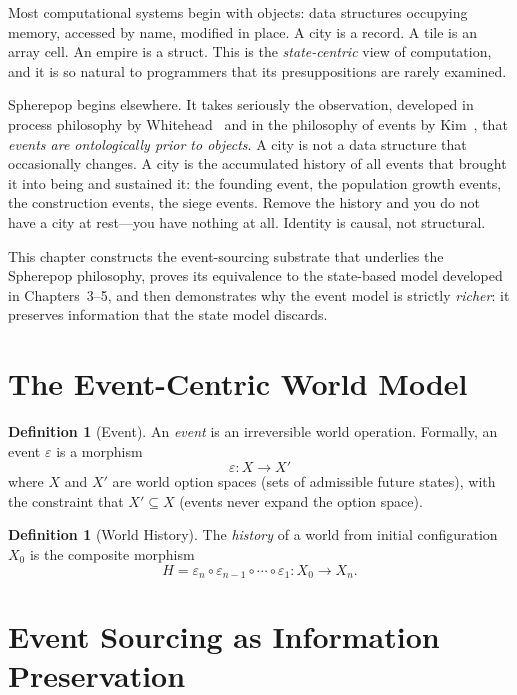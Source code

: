 \documentclass[11pt,a4paper,openany]{book}
\theoremstyle{plain}
\theoremstyle{definition}
\newtheorem{definition}[theorem]{Definition}
\theoremstyle{remark}
\newenvironment{background}{%
  \begin{mdframed}[
    linecolor=sphereblue!40, backgroundcolor=sphereblue!5,
    linewidth=1pt, innertopmargin=8pt, innerbottommargin=8pt,
    innerleftmargin=10pt, innerrightmargin=10pt,
    skipabove=10pt, skipbelow=6pt
  ]%
  \setlength{\parindent}{0pt}%
  \noindent{\textcolor{sphereblue}{\textbf{Background}}}\par\smallskip\ignorespaces
}{\end{mdframed}}
\begin{document}
\begin{background}
  Most computational systems begin with objects: data structures
  occupying memory, accessed by name, modified in place. A city is a
  record. A tile is an array cell. An empire is a struct. This is the
  \emph{state-centric} view of computation, and it is so natural to
  programmers that its presuppositions are rarely examined.

  Spherepop begins elsewhere. It takes seriously the observation,
  developed in process philosophy by Whitehead~\cite{Whitehead} and in
  the philosophy of events by Kim~\cite{Kim}, that \emph{events are
  ontologically prior to objects}. A city is not a data structure that
  occasionally changes. A city is the accumulated history of all events
  that brought it into being and sustained it: the founding event, the
  population growth events, the construction events, the siege events.
  Remove the history and you do not have a city at rest---you have
  nothing at all. Identity is causal, not structural.

  This chapter constructs the event-sourcing substrate that underlies the
  Spherepop philosophy, proves its equivalence to the state-based model
  developed in Chapters~3--5, and then demonstrates why the event model
  is strictly \emph{richer}: it preserves information that the state model
  discards.
\end{background}

\section{The Event-Centric World Model}

\begin{definition}[Event]
  An \emph{event} is an irreversible world operation. Formally, an event
  $\varepsilon$ is a morphism
  \[
    \varepsilon : X \to X'
  \]
  where $X$ and $X'$ are world option spaces (sets of admissible future
  states), with the constraint that $X' \subseteq X$ (events never expand
  the option space).
\end{definition}

\begin{definition}[World History]
  The \emph{history} of a world from initial configuration $X_0$ is the
  composite morphism
  \[
    H = \varepsilon_n \circ \varepsilon_{n-1} \circ \cdots \circ \varepsilon_1
    : X_0 \to X_n.
  \]
\end{definition}

\section{Event Sourcing as Information Preservation}
\end{document}
